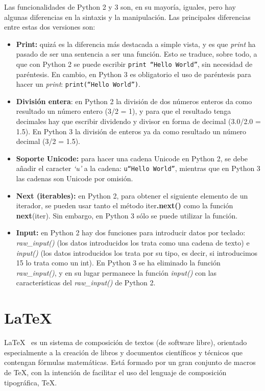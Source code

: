 \documentclass[a4paper, 12pt]{book}
\begin{document}
Las funcionalidades de Python 2 y 3 son, en su mayoría, iguales, pero hay algunas diferencias en la sintaxis y la manipulación. Las principales diferencias entre estas dos versiones son:
\begin{itemize}
	\item \textbf{Print:} quizá es la diferencia más destacada a simple vista, y es que \textit{print} ha pasado de ser una sentencia a ser una función. Esto se traduce, sobre todo, a que con Python 2 se puede escribir \texttt{print ``Hello World''}, sin necesidad de paréntesis. En cambio, en Python 3 es obligatorio el uso de paréntesis para hacer un \textit{print}: \texttt{print(``Hello World'')}.
	\item \textbf{División entera}: en Python 2 la división de dos números enteros da como resultado un número entero (3/2 = 1), y para que el resultado tenga decimales hay que escribir dividendo y divisor en forma de decimal (3.0/2.0 = 1.5). En Python 3 la división de enteros ya da como resultado un número decimal (3/2 = 1.5).
	\item \textbf{Soporte Unicode:} para hacer una cadena Unicode en Python 2, se debe añadir el caracter \textit{`u'} a la cadena: \texttt{u``Hello World''}, mientras que en Python 3 las cadenas son Unicode por omisión.
	\item \textbf{Next (iterables):} en Python 2, para obtener el siguiente elemento de un iterador, se pueden usar tanto el método iter\textbf{.next()} como la función \textbf{next}(iter). Sin embargo, en Python 3 sólo se puede utilizar la función.
	\item \textbf{Input:} en Python 2 hay dos funciones para introducir datos por teclado: \textit{raw\_input()} (los datos introducidos los trata como una cadena de texto) e \textit{input()} (los datos introducidos los trata por su tipo, es decir, si introducimos 15 lo trata como un int). En Python 3 se ha eliminado la función \textit{raw\_input()}, y en su lugar permanece la función \textit{input()} con las características del \textit{raw\_input()} de Python 2.
\end{itemize}



\section{\LaTeX}
\label{sec:latex}
\LaTeX~\cite{latex:1} es un sistema de composición de textos (de software libre), orientado especialmente a la creación de libros y documentos científicos y técnicos que contengan fórmulas matemáticas. Está formado por un gran conjunto de macros de \TeX, con la intención de facilitar el uso del lenguaje de composición tipográfica, \TeX.\\
\end{document}
